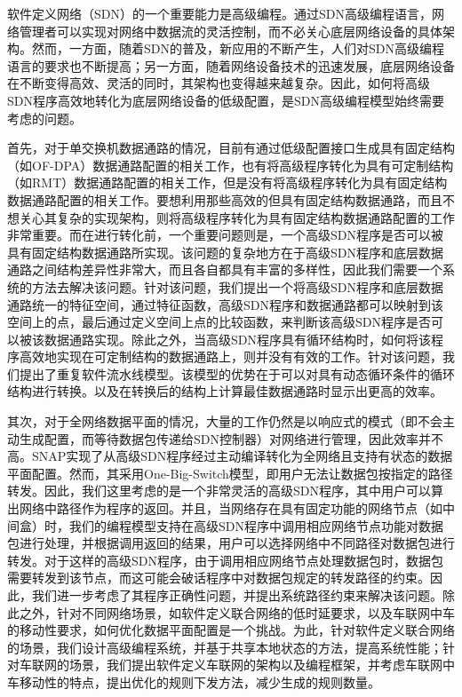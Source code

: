 \documentclass{ctexart}
\begin{document}
软件定义网络（SDN）的一个重要能力是高级编程。通过SDN高级编程语言，网络管理者可以实现对网络中数据流的灵活控制，而不必关心底层网络设备的具体架构。然而，一方面，随着SDN的普及，新应用的不断产生，人们对SDN高级编程语言的要求也不断提高；另一方面，随着网络设备技术的迅速发展，底层网络设备在不断变得高效、灵活的同时，其架构也变得越来越复杂。因此，如何将高级SDN程序高效地转化为底层网络设备的低级配置，是SDN高级编程模型始终需要考虑的问题。

首先，对于单交换机数据通路的情况，目前有通过低级配置接口生成具有固定结构（如OF-DPA）数据通路配置的相关工作，也有将高级程序转化为具有可定制结构（如RMT）数据通路配置的相关工作，但是没有将高级程序转化为具有固定结构数据通路配置的相关工作。要想利用那些高效的但具有固定结构数据通路，而且不想关心其复杂的实现架构，则将高级程序转化为具有固定结构数据通路配置的工作非常重要。而在进行转化前，一个重要问题则是，一个高级SDN程序是否可以被具有固定结构数据通路所实现。该问题的复杂地方在于高级SDN程序和底层数据通路之间结构差异性非常大，而且各自都具有丰富的多样性，因此我们需要一个系统的方法去解决该问题。针对该问题，我们提出一个将高级SDN程序和底层数据通路统一的特征空间，通过特征函数，高级SDN程序和数据通路都可以映射到该空间上的点，最后通过定义空间上点的比较函数，来判断该高级SDN程序是否可以被该数据通路实现。除此之外，当高级SDN程序具有循环结构时，如何将该程序高效地实现在可定制结构的数据通路上，则并没有有效的工作。针对该问题，我们提出了重复软件流水线模型。该模型的优势在于可以对具有动态循环条件的循环结构进行转换。以及在转换后的结构上计算最佳数据通路时显示出更高的效率。

其次，对于全网络数据平面的情况，大量的工作仍然是以响应式的模式（即不会主动生成配置，而等待数据包传递给SDN控制器）对网络进行管理，因此效率并不高。SNAP实现了从高级SDN程序经过主动编译转化为全网络且支持有状态的数据平面配置。然而，其采用One-Big-Switch模型，即用户无法让数据包按指定的路径转发。因此，我们这里考虑的是一个非常灵活的高级SDN程序，其中用户可以算出网络中路径作为程序的返回。并且，当网络存在具有固定功能的网络节点（如中间盒）时，我们的编程模型支持在高级SDN程序中调用相应网络节点功能对数据包进行处理，并根据调用返回的结果，用户可以选择网络中不同路径对数据包进行转发。对于这样的高级SDN程序，由于调用相应网络节点处理数据包时，数据包需要转发到该节点，而这可能会破话程序中对数据包规定的转发路径的约束。因此，我们进一步考虑了其程序正确性问题，并提出系统路径约束来解决该问题。除此之外，针对不同网络场景，如软件定义联合网络的低时延要求，以及车联网中车的移动性要求，如何优化数据平面配置是一个挑战。为此，针对软件定义联合网络的场景，我们设计高级编程系统，并基于共享本地状态的方法，提高系统性能；针对车联网的场景，我们提出软件定义车联网的架构以及编程框架，并考虑车联网中车移动性的特点，提出优化的规则下发方法，减少生成的规则数量。
\end{document}
